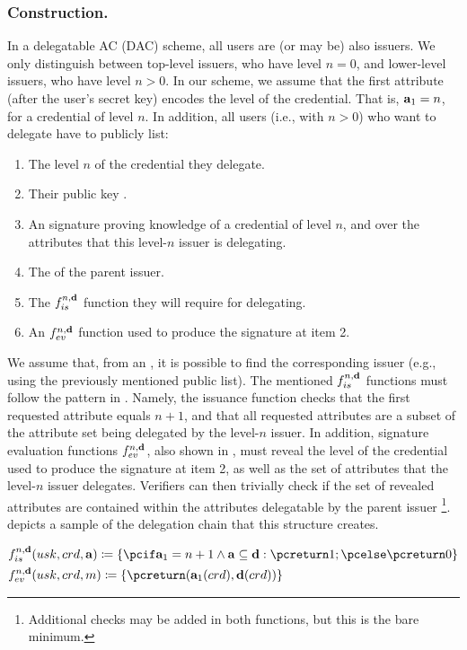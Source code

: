 \subsubsection{\CUASDAC Construction.} %
In a delegatable AC (DAC) scheme, all users are (or may be) also issuers. We
only distinguish between top-level issuers, who have level $n=0$, and
lower-level issuers, who have level $n>0$. In our \CUASDAC scheme, we assume
that the first attribute (after the user's secret key) encodes the level of
the credential. That is, $\mathbf{a}_1=n$, for a credential of level $n$. In
addition, all users (i.e., with $n>0$) who want to delegate have to publicly
list:

\begin{enumerate}
\item The level $n$ of the credential they delegate.
\item Their public key \ipk.
\item An \UAS signature proving knowledge of a credential of level $n$, and over
  the attributes that this level-$n$ issuer is delegating.
\item The \ipk of the parent issuer.
\item The $f_{is}^{n,\mathbf{d}}$ function they will require for delegating.
\item An $f_{ev}^{n,\mathbf{d}}$ function used to produce the signature at item 2.
\end{enumerate}

We assume that, from an \ipk, it is possible to find the corresponding issuer
(e.g., using the previously mentioned public list). The mentioned
$f_{is}^{n,\mathbf{d}}$ functions must follow the pattern in .
Namely, the issuance function checks that the first requested attribute equals
$n+1$, and that all requested attributes are a subset of the attribute set
\dattrs being delegated by the level-$n$ issuer. In addition, signature
evaluation functions $f_{ev}^{n,\mathbf{d}}$, also shown in ,
must reveal the level of the credential used to produce the \UAS signature at
item 2, as well as the set of attributes \dattrs that the level-$n$ issuer
delegates. Verifiers can then trivially check if the set of revealed attributes
are contained within the attributes delegatable by the parent issuer%
\footnote{Additional checks may be added in both functions, but this is
  the bare minimum.}.  depicts a sample of the delegation chain
that this structure creates.
 
\begin{align}
  & \fissue^{n,\dattrs}(\usk,\cred,\attrs) \coloneqq \lbrace
    \pcif \attrs_1 = n+1 \land \attrs \subseteq \dattrs: \pcreturn 1; \pcelse \pcreturn 0
    \rbrace \nonumber \\
  & \feval^{n,\dattrs}(\usk,\cred,\msg) \coloneqq \lbrace
    \pcreturn (\attrs_1(\cred),\dattrs(\cred)) \rbrace
  \label{eq:funcs-dac}
\end{align}

